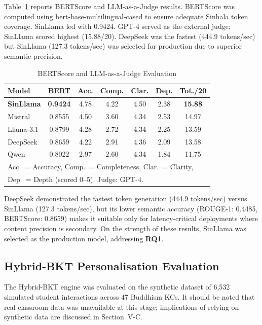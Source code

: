 \documentclass[conference]{IEEEtran}
\begin{document}
Table~\ref{tab:bertscore} reports BERTScore and LLM-as-a-Judge results. BERTScore was computed using bert-base-multilingual-cased to ensure adequate Sinhala token coverage. SinLlama led with 0.9424. GPT-4 served as the external judge; SinLlama scored highest (15.88/20). DeepSeek was the fastest (444.9 tokens/sec) but SinLlama (127.3 tokens/sec) was selected for production due to superior semantic precision.

\begin{table}[htbp]
\caption{BERTScore and LLM-as-a-Judge Evaluation}
\begin{center}
\begin{tabular}{|l|c|c|c|c|c|c|}
\hline
\textbf{Model} & \textbf{BERT} & \textbf{Acc.} & \textbf{Comp.} & \textbf{Clar.} & \textbf{Dep.} & \textbf{Tot./20} \\
\hline
\textbf{SinLlama} & \textbf{0.9424} & 4.78 & 4.22 & 4.50 & 2.38 & \textbf{15.88} \\
\hline
Mistral & 0.8555 & 4.50 & 3.60 & 4.34 & 2.53 & 14.97 \\
\hline
Llama-3.1 & 0.8799 & 4.28 & 2.72 & 4.34 & 2.25 & 13.59 \\
\hline
DeepSeek & 0.8659 & 4.22 & 2.91 & 4.36 & 2.09 & 13.58 \\
\hline
Qwen & 0.8022 & 2.97 & 2.60 & 4.34 & 1.84 & 11.75 \\
\hline
\multicolumn{7}{l}{\footnotesize Acc.~= Accuracy, Comp.~= Completeness, Clar.~= Clarity,} \\
\multicolumn{7}{l}{\footnotesize Dep.~= Depth (scored 0--5). Judge: GPT-4.} \\
\end{tabular}
\label{tab:bertscore}
\end{center}
\end{table}

DeepSeek demonstrated the fastest token generation (444.9 tokens/sec) versus SinLlama (127.3 tokens/sec), but its lower semantic accuracy (ROUGE-1: 0.4485, BERTScore: 0.8659) makes it suitable only for latency-critical deployments where content precision is secondary. On the strength of these results, SinLlama was selected as the production model, addressing \textbf{RQ1}.

\subsection{Hybrid-BKT Personalisation Evaluation}

The Hybrid-BKT engine was evaluated on the synthetic dataset of 6,532 simulated student interactions across 47 Buddhism KCs. It should be noted that real classroom data was unavailable at this stage; implications of relying on synthetic data are discussed in Section~V-C.
\end{document}
